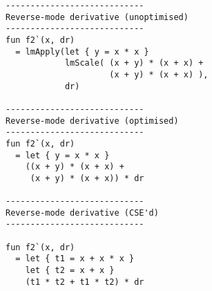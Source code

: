 \documentclass[sigplan,review]{acmart}
\begin{document}
{\begin{verbatim}
----------------------------
Reverse-mode derivative (unoptimised)
----------------------------
fun f2`(x, dr)
  = lmApply(let { y = x * x }
            lmScale( (x + y) * (x + x) +
                     (x + y) * (x + x) ),
            dr)

----------------------------
Reverse-mode derivative (optimised)
----------------------------
fun f2`(x, dr)
  = let { y = x * x }
    ((x + y) * (x + x) +
     (x + y) * (x + x)) * dr

----------------------------
Reverse-mode derivative (CSE'd)
----------------------------

fun f2`(x, dr)
  = let { t1 = x + x * x }
    let { t2 = x + x }
    (t1 * t2 + t1 * t2) * dr
\end{verbatim}
}
\end{document}
